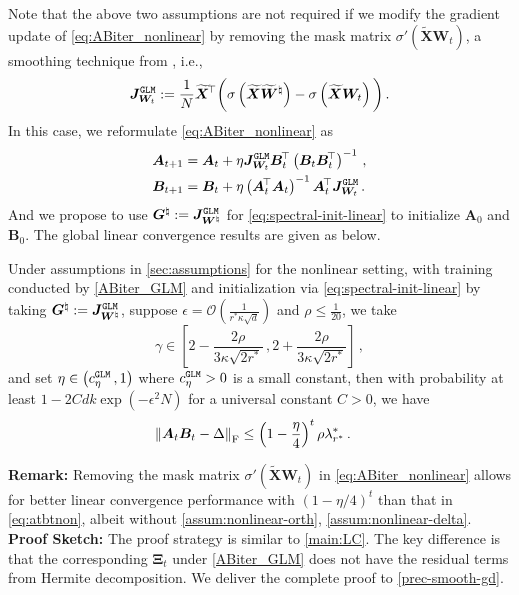 Note that the above two assumptions are not required if we modify the gradient update of \cref{eq:ABiter_nonlinear} by removing the mask matrix $\sigma'(\widetilde{\bm X}\bm W_t)$, a smoothing technique from \cite{kalai2009isotron,kakade2011efficient,wu2023finite}, i.e.,
\begin{align*}
    \bm J_{\bm W_t}^{\tt GLM} := \frac{1}{N}\widetilde{\bm X}^{\!\top}\bigg(\sigma\left(\widetilde{\bm X}\widetilde{\bm W}^\natural\right)-\sigma\left(\widetilde{\bm X}\bm W_t\right)\bigg)\,.
\end{align*}
In this case, we reformulate \cref{eq:ABiter_nonlinear} as
\begin{equation}\label{ABiter_GLM}
    \begin{split}
        \bm A_{t+1} & = \bm A_t + \eta \bm J_{\bm W_t}^{\tt GLM}\bm B_t^{\!\top}\left(\bm B_t\bm B_t^{\!\top}\right)^{-1}\,,\\
        \bm B_{t+1} & = \bm B_t + \eta \left(\bm A_t^{\!\top}\bm A_t\right)^{-1}\bm A_t^{\!\top}\bm J_{\bm W_t}^{\tt GLM}\,.
    \end{split}
\end{equation}
And we propose to use $\bm G^\natural := \bm J_{\bm W^\natural}^{\tt GLM}$ for \eqref{eq:spectral-init-linear} to initialize $\bm A_0$ and $\bm B_0$. The global linear convergence results are given as below.
\begin{theorem}\label{main:smo-LC}
    Under assumptions in \cref{sec:assumptions} for the nonlinear setting, with training conducted by \cref{ABiter_GLM} and initialization via \eqref{eq:spectral-init-linear} by taking $\bm G^\natural := \bm J_{\bm W^\natural}^{\tt GLM}$, suppose $\epsilon = \mathcal{O}\left(\frac{1}{r^* \kappa \sqrt{d}}\right)$ and $\rho\leq\frac{1}{20}$, we take 
    \begin{equation*}
       \gamma\in\left[2-\frac{2\rho}{3\kappa\sqrt{2r^*}}\,,2+\frac{2\rho}{3\kappa\sqrt{2r^*}}\right]\,,
    \end{equation*}
   and set $\eta \in \left(c^{\tt GLM}_{\eta}\,,1\right)$ where $c^{\tt GLM}_{\eta}>0$ is a small constant, then with probability at least $1-2Cdk\operatorname{exp}\left(-\epsilon^2 N\right)$ for a universal constant $C>0$, we have
    \begin{align*}
            \left\|\bm A_{t}\bm B_{t} - \Delta\right\|_{\rm F} & \leq \left(1-\frac{\eta}{4}\right)^t \rho\lambda^*_{r^*}\,.
        \end{align*}
\end{theorem}

\noindent
{\bf Remark:} Removing the mask matrix $\sigma'(\widetilde{\bm X}\bm W_t)$ in \cref{eq:ABiter_nonlinear} allows for better linear convergence performance with $(1-\eta/4)^t$ than that in \cref{eq:atbtnon}, albeit without \cref{assum:nonlinear-orth}, \ref{assum:nonlinear-delta}.\\

\noindent
{\bf Proof Sketch:} The proof strategy is similar to \cref{main:LC}. The key difference is that the corresponding $\bm \Xi_t$ under \cref{ABiter_GLM} does not have the residual terms from Hermite decomposition. We deliver the complete proof to \cref{prec-smooth-gd}.